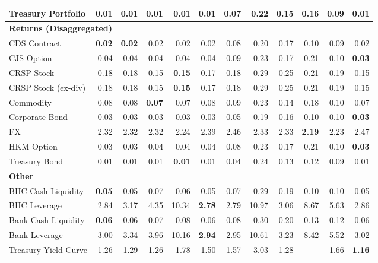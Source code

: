 \begin{table}[htbp]
\begin{tabular}{@{}lrrrrrrrrrrr@{}}
Treasury Portfolio & 0.01 & 0.01 & 0.01 & \textbf{0.01} & 0.01 & 0.07 & 0.22 & 0.15 & 0.16 & 0.09 & 0.01 \\
\midrule
\multicolumn{12}{l}{\textbf{Returns (Disaggregated)}} \\
CDS Contract & \textbf{0.02} & \textbf{0.02} & 0.02 & 0.02 & 0.02 & 0.08 & 0.20 & 0.17 & 0.10 & 0.09 & 0.02 \\
CJS Option & 0.04 & 0.04 & 0.04 & 0.04 & 0.04 & 0.09 & 0.23 & 0.17 & 0.21 & 0.10 & \textbf{0.03} \\
CRSP Stock & 0.18 & 0.18 & 0.15 & \textbf{0.15} & 0.17 & 0.18 & 0.29 & 0.25 & 0.21 & 0.19 & 0.15 \\
CRSP Stock (ex-div) & 0.18 & 0.18 & 0.15 & \textbf{0.15} & 0.17 & 0.18 & 0.29 & 0.25 & 0.21 & 0.19 & 0.15 \\
Commodity & 0.08 & 0.08 & \textbf{0.07} & 0.07 & 0.08 & 0.09 & 0.23 & 0.14 & 0.18 & 0.10 & 0.07 \\
Corporate Bond & 0.03 & 0.03 & 0.03 & 0.03 & 0.03 & 0.05 & 0.19 & 0.16 & 0.10 & 0.10 & \textbf{0.03} \\
FX & 2.32 & 2.32 & 2.32 & 2.24 & 2.39 & 2.46 & 2.33 & 2.33 & \textbf{2.19} & 2.23 & 2.47 \\
HKM Option & 0.03 & 0.03 & 0.04 & 0.04 & 0.04 & 0.08 & 0.23 & 0.17 & 0.21 & 0.10 & \textbf{0.03} \\
Treasury Bond & 0.01 & 0.01 & 0.01 & \textbf{0.01} & 0.01 & 0.04 & 0.24 & 0.13 & 0.12 & 0.09 & 0.01 \\
\midrule
\multicolumn{12}{l}{\textbf{Other}} \\
BHC Cash Liquidity & \textbf{0.05} & 0.05 & 0.07 & 0.06 & 0.05 & 0.07 & 0.29 & 0.19 & 0.10 & 0.10 & 0.05 \\
BHC Leverage & 2.84 & 3.17 & 4.35 & 10.34 & \textbf{2.78} & 2.79 & 10.97 & 3.06 & 8.67 & 5.63 & 2.86 \\
Bank Cash Liquidity & \textbf{0.06} & 0.06 & 0.07 & 0.08 & 0.06 & 0.08 & 0.30 & 0.20 & 0.13 & 0.12 & 0.06 \\
Bank Leverage & 3.00 & 3.34 & 3.96 & 10.16 & \textbf{2.94} & 2.95 & 10.61 & 3.23 & 8.42 & 5.52 & 3.02 \\
Treasury Yield Curve & 1.26 & 1.29 & 1.26 & 1.78 & 1.50 & 1.57 & 3.03 & 1.28 & -- & 1.66 & \textbf{1.16} \\
\bottomrule
\end{tabular}
\vspace{0.1cm}

\end{table}
